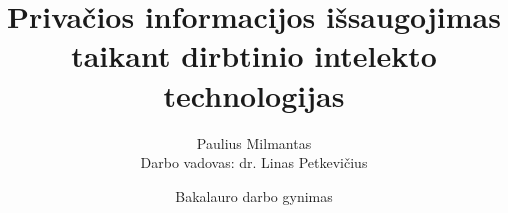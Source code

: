 
\title[Privačios informacijos išsaugojimas]
{Privačios informacijos išsaugojimas taikant dirbtinio intelekto technologijas}

\author[Paulius Milmantas]
{Paulius Milmantas\\
Darbo vadovas: dr. Linas Petkevičius}
 

\date[2021-05-14]{Bakalauro darbo gynimas}
